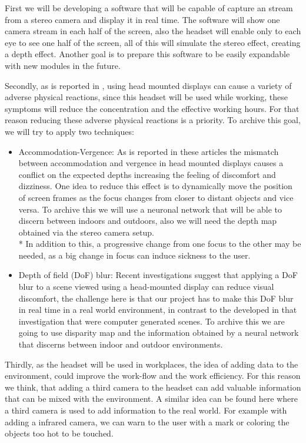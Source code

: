 \documentclass[10pt,a4paper,twocolumn,twoside]{article}
\begin{document}
First we will be developing a software that will be capable of capture an stream from a stereo camera and display it in real time. The software will show one camera stream in each half of the screen, also the headset will enable only to each eye to see one half of the screen, all of this will simulate the stereo effect, creating a depth effect. Another goal is to prepare this software to be easily expandable with new modules in the future.

Secondly, as is reported in \cite{disconfortReview}, using head mounted displays can cause a variety of adverse physical reactions, since this headset will be used while working, these symptoms will reduce the concentration and the effective working hours. For that reason reducing these adverse physical reactions is a priority. To archive this goal, we will try to apply two techniques: 

\begin{itemize}
	\item Accommodation-Vergence: As is reported in these \cite{disconfortReview}\cite{vergenceDisconfort} articles the mismatch between accommodation and vergence in head mounted displays causes a conflict on the expected depths increasing the feeling of discomfort and dizziness.  One idea to reduce this effect is to dynamically move the position of screen frames as the focus changes from closer to distant objects and vice versa. To archive this we will use a neuronal network that will be able to discern between indoors and outdoors, also we will need the depth map obtained via the stereo camera setup. \\*
	In addition to this, a progressive change from one focus to the other may be needed, as a big change in focus can induce sickness to the user.
	
	\item Depth of field (DoF) blur: Recent investigations\cite{ifftConfortDoF} suggest that applying a DoF blur to a scene viewed using a head-mounted display can reduce visual discomfort, the challenge here is that our project has to make this DoF blur in real time in a real world environment, in contrast to the developed in that investigation that were computer generated scenes. To archive this we are going to use disparity map and the information obtained by a neural network that discerns between indoor and outdoor environments.
\end{itemize} 

Thirdly, as the headset will be used in workplaces, the idea of adding data to the environment, could improve the work-flow and the work efficiency. For this reason we think, that adding a third camera to the headset can add valuable information that can be mixed with the environment. A similar idea can be found here \cite{vismerge} where a third camera is used to add information to the real world. For example with adding a infrared camera, we can warn to the user with a mark or coloring the objects too hot to be touched.
\end{document}
